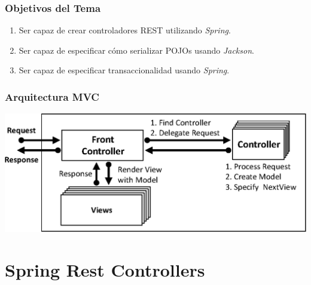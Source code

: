 \documentclass[handout,a4paper,slidestop,xcolor=pst,blue]{beamer}
\begin{document}
\begin{frame}[c]
    \frametitle{Objetivos del Tema}
    \begin{enumerate}[<+->]
         \item Ser capaz de crear controladores REST utilizando \emph{Spring}.
         \item Ser capaz de especificar cómo serializar POJOs usando \emph{Jackson}.
         \item Ser capaz de especificar transaccionalidad usando \emph{Spring}.
    \end{enumerate}
\end{frame}

%
%

\begin{frame}[c]
    \frametitle{Arquitectura MVC}
    \begin{center}
        \includegraphics[width=\linewidth,keepaspectratio=true]{images/mvc/mvc00.eps}
    \end{center}
\end{frame}

\section{Spring Rest Controllers}
\end{document}
